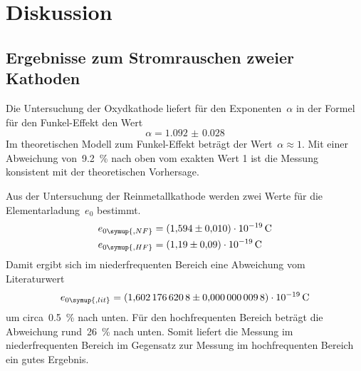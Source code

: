 \section{Diskussion}
\label{sec:diskussion}

\subsection{Ergebnisse zum Stromrauschen zweier Kathoden}

Die Untersuchung der Oxydkathode liefert für den Exponenten~$\alpha$ in der
Formel für den Funkel-Effekt den Wert
%
\begin{equation}
  \alpha=\num{1.092(28)}
\end{equation}
%
Im theoretischen Modell zum Funkel-Effekt beträgt der Wert~$\alpha\approx 1$.
Mit einer Abweichung von~\SI{9.2}{\percent} nach oben vom exakten Wert 1 ist die
Messung konsistent mit der theoretischen Vorhersage.

Aus der Untersuchung der Reinmetallkathode werden zwei Werte für die
Elementarladung~$e_0$ bestimmt.
%
\begin{align}
  e_{0\symup{, NF}}&=\SI{1.594(10)e-19}{\coulomb} \\
  e_{0\symup{, HF}}&=\SI{1.19(9)e-19}{\coulomb}
\end{align}
%
Damit ergibt sich im niederfrequenten Bereich eine Abweichung vom
Literaturwert~\cite{CODATA}
%
\begin{equation}
  e_{0\symup{, lit}}=\SI{1.6021766208(98)e-19}{\coulomb}
\end{equation}
%
um circa~\SI{0.5}{\percent} nach unten. Für den hochfrequenten Bereich beträgt
die Abweichung rund~\SI{26}{\percent} nach unten. Somit liefert die Messung im
niederfrequenten Bereich im Gegensatz zur Messung im hochfrequenten Bereich ein
gutes Ergebnis.
%
\nocite{V57}
